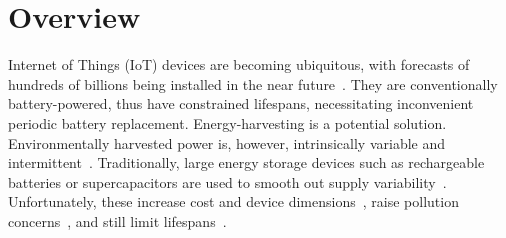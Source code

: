 
\section{Overview} \label{section:intro}


Internet of Things (IoT) devices are becoming ubiquitous, with forecasts of hundreds of billions being installed in the near future~\cite{sparks2017trillion}.
They are conventionally battery-powered, thus have constrained lifespans, necessitating inconvenient periodic battery replacement. %
Energy-harvesting is a potential solution. Environmentally harvested power is, however, intrinsically variable and intermittent~\cite{4494336}. Traditionally, large energy storage devices such as rechargeable batteries or supercapacitors are used to smooth out supply variability~\cite{Kansal:2007:PME:1274858.1274870}. Unfortunately, these increase cost and device dimensions~\cite{4494753}, raise pollution concerns~\cite{LIU2014210}, and still limit lifespans~\cite{AKHTAR2015769}. 

